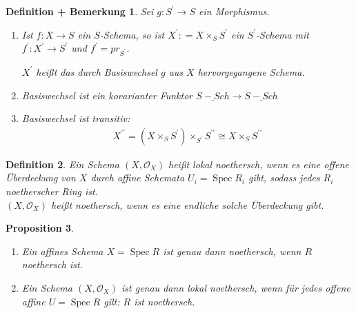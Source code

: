 \documentclass[a4paper,oneside]{scrbook}
\theoremstyle{break}
\newtheorem{Def}{Definition}[section]
\newtheorem{DefBem}[Def]{Definition + Bemerkung}
\newtheorem{Prop}[Def]{Proposition}
\theoremstyle{nonumberbreak}
\theoremstyle{nonumberplain}
\theoremstyle{break}
\newcommand{\defeqr}[0]{\mathrel{\mathop:}=}
\newcommand{\Spec}{%
	\ensuremath{\operatorname{Spec}}%
}
\begin{document}
\begin{DefBem}
  \label{defbem:5.4}
  Sei $g:S^\prime\to S$ ein Morphismus.
  \begin{enumerate}
  \item Ist $f:X\to S$ ein $S$-Schema, so ist $X^\prime\defeqr X\times_S S^\prime$ ein $S^\prime$-Schema mit
    $f^\prime:X^\prime\to S^\prime$ und $f^\prime=pr_{S^\prime}$. \\
    \begin{center}
    \end{center}
    $X^\prime$ heißt das durch \emph{Basiswechsel} $g$ aus $X$ hervorgegangene Schema.
  \item Basiswechsel ist ein kovarianter Funktor $\underline{S-Sch}\to \underline{S-Sch}$
  \item Basiswechsel ist transitiv:
    \begin{align*}
      X^{\prime\prime}=(X\times_S S^\prime)\times_{S^\prime} S^{\prime\prime}\cong X\times_S S^{\prime\prime}
    \end{align*}
  \end{enumerate}
\end{DefBem}

\begin{Def}
  \label{def:5.5}
  Ein Schema $(X,\mathcal O_X)$ heißt \emph{lokal noethersch}, wenn es eine offene Überdeckung von $X$
  durch affine Schemata $U_i=\Spec R_i$ gibt, sodass jedes $R_i$ noetherscher Ring ist. \\
  $(X,\mathcal O_X)$ heißt \emph{noethersch}, wenn es eine endliche solche Überdeckung gibt.
\end{Def}

\begin{Prop}
  \label{prop:5.6}
  \begin{enumerate}
  \item Ein affines Schema $X=\Spec R$ ist genau dann noethersch, wenn $R$ noethersch ist.
  \item Ein Schema $(X,\mathcal O_X)$ ist genau dann lokal noethersch, wenn für jedes offene affine 
    $U=\Spec R$ gilt: $R$ ist noethersch.
  \end{enumerate}
\end{Prop}
\end{document}
